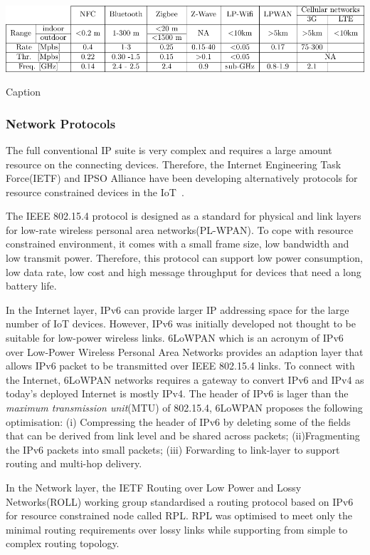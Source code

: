 \begin{table}[ht!]
    \centering
    \includegraphics[scale=.95]{Table/2-2-wireless.pdf}
    \caption{Caption}
    \label{tab:my_label}
\end{table}

\subsubsection{Network Protocols}

The full conventional IP suite is very complex and requires a large amount resource on the connecting devices.  
Therefore, the Internet Engineering Task Force(IETF) and IPSO Alliance have been developing alternatively protocols for resource constrained devices in the IoT~\citep{Ishaq:2013, alliance:2011}. 

The IEEE 802.15.4 protocol is designed as a standard for physical and link layers for low-rate wireless personal area networks(PL-WPAN).
To cope with resource constrained environment, it comes with a small frame size, low bandwidth and low transmit power.
Therefore, this protocol can support low power consumption, low data rate, low cost and high message throughput for devices that need a long battery life.

In the Internet layer, IPv6 can provide larger IP addressing space for the large number of IoT devices. 
However, IPv6 was initially developed not thought to be suitable for low-power wireless links.
6LoWPAN which is an acronym of IPv6 over Low-Power Wireless Personal Area Networks provides an adaption layer that allows IPv6 packet to be transmitted over IEEE 802.15.4 links.
To connect with the Internet, 6LoWPAN networks requires a gateway to convert IPv6 and IPv4 as today’s deployed Internet is mostly IPv4. 
The header of IPv6 is lager than the \textit{maximum transmission unit}(MTU) of 802.15.4, 6LoWPAN proposes the following optimisation:
(i) Compressing the header of IPv6 by deleting some of the fields that can be derived from link level and be shared across packets;
(ii)Fragmenting the IPv6 packets into small packets;
(iii) Forwarding to link-layer to support routing and multi-hop delivery.

In the Network layer, the IETF Routing over Low Power and Lossy Networks(ROLL) working group standardised a routing protocol based on IPv6 for resource constrained node called RPL.
RPL was optimised to meet only the minimal routing requirements over lossy links while supporting from simple to complex routing topology.


